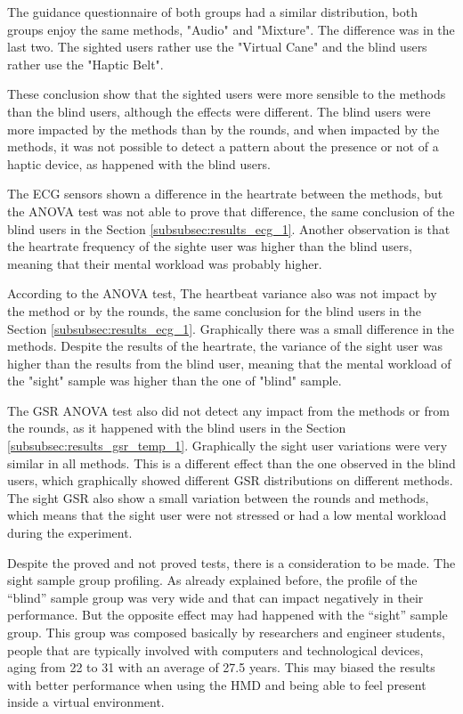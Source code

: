 The guidance questionnaire of both groups had a similar distribution, both groups enjoy the same methods, "Audio" and "Mixture". The difference was in the last two. The sighted users rather use the "Virtual Cane" and the blind users rather use the "Haptic Belt".

These conclusion show that the sighted users were more sensible to the methods than the blind users, although the effects were different. The blind users were more impacted by the methods than by the rounds, and when impacted by the methods, it was not possible to detect a pattern about the presence or not of a haptic device, as happened with the blind users.

The ECG sensors shown a difference in the heartrate between the methods, but the ANOVA test was not able to prove that difference, the same conclusion of the blind users in the Section \ref{subsubsec:results_ecg_1}. Another observation is that the heartrate frequency of the sighte user was higher than the blind users, meaning that their mental workload was probably higher.

According to the ANOVA test, The heartbeat variance also was not impact by the method or by the rounds, the same conclusion for the blind users in the Section \ref{subsubsec:results_ecg_1}. Graphically there was a small difference in the methods. Despite the results of the heartrate, the variance of the sight user was higher than the results from the blind user, meaning that the mental workload of the "sight" sample was higher than the one of "blind" sample.

The GSR ANOVA test also did not detect any impact from the methods or from the rounds, as it happened with the blind users in the Section \ref{subsubsec:results_gsr_temp_1}. Graphically the sight user variations were very similar in all methods. This is a different effect than the one observed in the blind users, which graphically showed different GSR distributions on different methods. The sight GSR also show a small variation between the rounds and methods, which means that the sight user were not stressed or had a low mental workload during the experiment.

Despite the proved and not proved tests, there is a consideration to be made. The sight sample group profiling. As already explained before, the profile of the “blind” sample group was very wide and that can impact negatively in their performance. But the opposite effect may had happened with the “sight” sample group. This group was composed basically by researchers and engineer students, people that are typically involved with computers and technological devices, aging from 22 to 31 with an average of 27.5 years. This may biased the results with better performance when using the HMD and being able to feel present inside a virtual environment.

